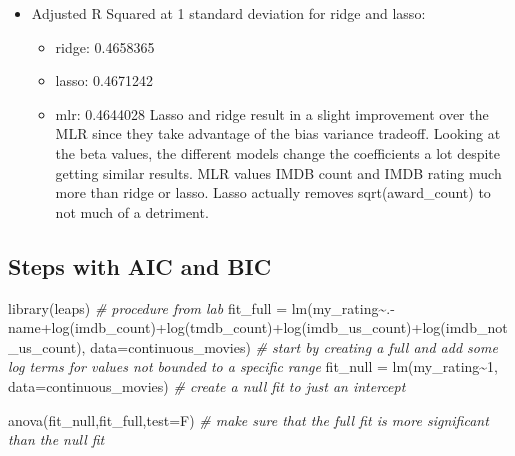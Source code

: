 \documentclass[
]{article}
\newenvironment{Shaded}{\begin{snugshade}}{\end{snugshade}}
\newcommand{\AttributeTok}[1]{\textcolor[rgb]{0.77,0.63,0.00}{#1}}
\newcommand{\CommentTok}[1]{\textcolor[rgb]{0.56,0.35,0.01}{\textit{#1}}}
\newcommand{\DecValTok}[1]{\textcolor[rgb]{0.00,0.00,0.81}{#1}}
\newcommand{\FunctionTok}[1]{\textcolor[rgb]{0.00,0.00,0.00}{#1}}
\newcommand{\NormalTok}[1]{#1}
\newcommand{\OtherTok}[1]{\textcolor[rgb]{0.56,0.35,0.01}{#1}}
\newcommand{\SpecialCharTok}[1]{\textcolor[rgb]{0.00,0.00,0.00}{#1}}
\newcommand{\StringTok}[1]{\textcolor[rgb]{0.31,0.60,0.02}{#1}}
\providecommand{\tightlist}{%
  \setlength{\itemsep}{0pt}\setlength{\parskip}{0pt}}
\begin{document}
\begin{itemize}
\tightlist
\item
  Adjusted R Squared at 1 standard deviation for ridge and lasso:

  \begin{itemize}
  \tightlist
  \item
    ridge: 0.4658365
  \item
    lasso: 0.4671242
  \item
    mlr: 0.4644028 Lasso and ridge result in a slight improvement over
    the MLR since they take advantage of the bias variance tradeoff.
    Looking at the beta values, the different models change the
    coefficients a lot despite getting similar results. MLR values IMDB
    count and IMDB rating much more than ridge or lasso. Lasso actually
    removes sqrt(award\_count) to not much of a detriment.
  \end{itemize}
\end{itemize}

\hypertarget{steps-with-aic-and-bic}{%
\subsection{Steps with AIC and BIC}\label{steps-with-aic-and-bic}}

\begin{Shaded}
\begin{Highlighting}[]
\FunctionTok{library}\NormalTok{(leaps) }\CommentTok{\# procedure from lab}
\NormalTok{fit\_full }\OtherTok{=} \FunctionTok{lm}\NormalTok{(my\_rating}\SpecialCharTok{\textasciitilde{}}\NormalTok{.}\SpecialCharTok{{-}}\NormalTok{name}\SpecialCharTok{+}\FunctionTok{log}\NormalTok{(imdb\_count)}\SpecialCharTok{+}\FunctionTok{log}\NormalTok{(tmdb\_count)}\SpecialCharTok{+}\FunctionTok{log}\NormalTok{(imdb\_us\_count)}\SpecialCharTok{+}\FunctionTok{log}\NormalTok{(imdb\_not\_us\_count), }\AttributeTok{data=}\NormalTok{continuous\_movies) }\CommentTok{\# start by creating a full and add some log terms for values not bounded to a specific range}
\NormalTok{fit\_null }\OtherTok{=} \FunctionTok{lm}\NormalTok{(my\_rating}\SpecialCharTok{\textasciitilde{}}\DecValTok{1}\NormalTok{, }\AttributeTok{data=}\NormalTok{continuous\_movies) }\CommentTok{\# create a null fit to just an intercept}
\end{Highlighting}
\end{Shaded}

\begin{Shaded}
\begin{Highlighting}[]
\FunctionTok{anova}\NormalTok{(fit\_null,fit\_full,}\AttributeTok{test=}\StringTok{\textquotesingle{}F\textquotesingle{}}\NormalTok{) }\CommentTok{\# make sure that the full fit is more significant than the null fit}
\end{Highlighting}
\end{Shaded}
\end{document}
